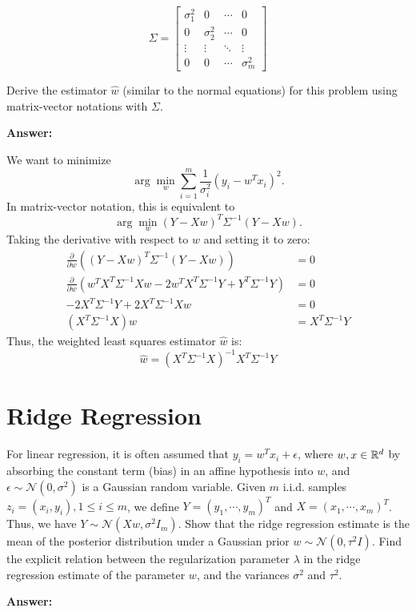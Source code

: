 \documentclass{article}
\begin{document}
$$\Sigma = \begin{bmatrix}
    \sigma_1^2 & 0 & \cdots & 0\\
    0 & \sigma_2^2 & \cdots & 0\\
    \vdots & \vdots & \ddots & \vdots\\
    0 & 0 & \cdots & \sigma_m^2
\end{bmatrix}$$

Derive the estimator $\hat{w}$ (similar to the normal equations) for this problem using matrix-vector notations with $\Sigma$.

\textbf{Answer:}

We want to minimize
$$\arg\min_w \sum_{i=1}^{m} \frac{1}{\sigma_i^2}(y_i - w^T x_i)^2.$$
In matrix-vector notation, this is equivalent to
$$\arg\min_w (Y - Xw)^T \Sigma^{-1} (Y - Xw).$$
Taking the derivative with respect to $w$ and setting it to zero:
\begin{align*}
    \frac{\partial}{\partial w}\left((Y - Xw)^T \Sigma^{-1} (Y - Xw)\right) &= 0\\
    \frac{\partial}{\partial w}\left(w^T X^T \Sigma^{-1} X w - 2w^T X^T \Sigma^{-1} Y + Y^T \Sigma^{-1} Y\right) &= 0\\
    -2X^T \Sigma^{-1} Y + 2X^T \Sigma^{-1} Xw &= 0\\
    (X^T \Sigma^{-1} X)w &= X^T \Sigma^{-1} Y
\end{align*}
Thus, the weighted least squares estimator $\hat{w}$ is:
$$\hat{w} = (X^T \Sigma^{-1} X)^{-1} X^T \Sigma^{-1} Y$$

\section{Ridge Regression}

For linear regression, it is often assumed that $y_i = w^Tx_i + \epsilon$, where $w, x \in \mathbb{R}^d$ by absorbing the constant term (bias) in an affine hypothesis into $w$, and $\epsilon \sim \mathcal{N}(0, \sigma^2)$ is a Gaussian random variable.
Given $m$ i.i.d. samples $z_i = (x_i, y_i), 1 \leq i \leq m$, we define $Y = (y_1, \cdots, y_m)^T$ and $X = (x_1, \cdots, x_m)^T$.
Thus, we have $Y \sim \mathcal{N}(Xw, \sigma^2I_m)$.
Show that the ridge regression estimate is the mean of the posterior distribution under a Gaussian prior $w \sim \mathcal{N}(0, \tau^2I).$
Find the explicit relation between the regularization parameter $\lambda$ in the ridge regression estimate of the parameter $w$, and the variances $\sigma^2$ and $\tau^2$.

\textbf{Answer:}
\end{document}
